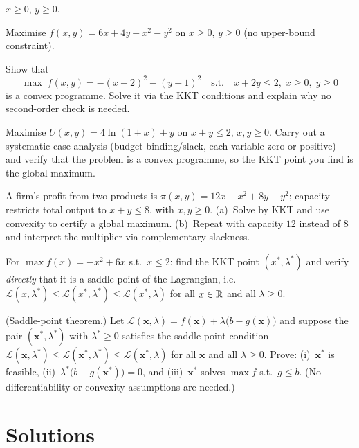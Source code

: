 \begin{problems}
        $x \geq 0$, $y \geq 0$.
  \item Maximise $f(x, y) = 6 x + 4 y - x^2 - y^2$ on
        $x \geq 0$, $y \geq 0$ (no upper-bound constraint).
  \item Show that
        \[
          \max\; f(x, y) = -(x - 2)^2 - (y - 1)^2
          \quad \text{s.t.} \quad x + 2 y \leq 2, \; x \geq 0, \; y \geq 0
        \]
        is a convex programme. Solve it via the KKT conditions and explain
        why no second-order check is needed.
  \item Maximise $U(x, y) = 4 \ln(1 + x) + y$ on $x + y \leq 2$,
        $x, y \geq 0$. Carry out a systematic case analysis (budget
        binding/slack, each variable zero or positive) and verify that the
        problem is a convex programme, so the KKT point you find is the
        global maximum.
  \item A firm's profit from two products is
        $\pi(x, y) = 12 x - x^2 + 8 y - y^2$; capacity restricts total
        output to $x + y \leq 8$, with $x, y \geq 0$. (a)~Solve by KKT and
        use convexity to certify a global maximum. (b)~Repeat with capacity
        $12$ instead of $8$ and interpret the multiplier via complementary
        slackness.
  \item For $\max f(x) = -x^2 + 6 x$ s.t.\ $x \leq 2$: find the KKT point
        $(x^*, \lambda^*)$ and verify \emph{directly} that it is a saddle
        point of the Lagrangian, i.e.\
        $\mathcal{L}(x, \lambda^*) \leq \mathcal{L}(x^*, \lambda^*)
        \leq \mathcal{L}(x^*, \lambda)$ for all $x \in \mathbb{R}$ and all
        $\lambda \geq 0$.
  \item (Saddle-point theorem.) Let
        $\mathcal{L}(\mathbf{x}, \lambda)
        = f(\mathbf{x}) + \lambda\bigl(b - g(\mathbf{x})\bigr)$ and suppose
        the pair $(\mathbf{x}^*, \lambda^*)$ with $\lambda^* \geq 0$
        satisfies the saddle-point condition
        $\mathcal{L}(\mathbf{x}, \lambda^*)
        \leq \mathcal{L}(\mathbf{x}^*, \lambda^*)
        \leq \mathcal{L}(\mathbf{x}^*, \lambda)$ for all $\mathbf{x}$ and
        all $\lambda \geq 0$. Prove: (i)~$\mathbf{x}^*$ is feasible,
        (ii)~$\lambda^*\bigl(b - g(\mathbf{x}^*)\bigr) = 0$, and
        (iii)~$\mathbf{x}^*$ solves $\max f$ s.t.\ $g \leq b$. (No
        differentiability or convexity assumptions are needed.)
\end{problems}

\section{Solutions}

